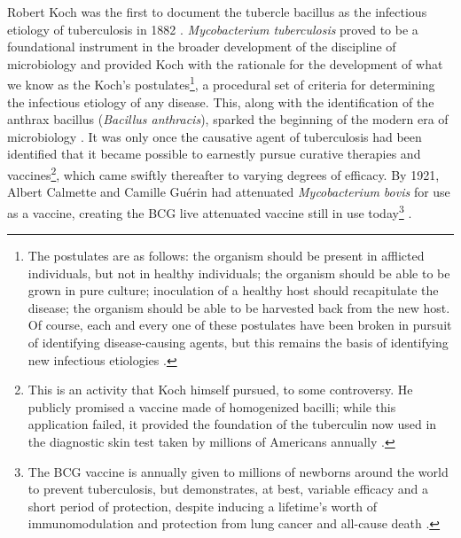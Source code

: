 Robert Koch was the first to document the tubercle bacillus as the infectious etiology of tuberculosis in 1882 \citep{Koch1882, Cambau2014}. \textit{Mycobacterium tuberculosis} proved to be a foundational instrument in the broader development of the discipline of microbiology and provided Koch with the rationale for the development of what we know as the Koch's postulates\footnote{The postulates are as follows: the organism should be present in afflicted individuals, but not in healthy individuals; the organism should be able to be grown in pure culture; inoculation of a healthy host should recapitulate the disease; the organism should be able to be harvested back from the new host. Of course, each and every one of these postulates have been broken in pursuit of identifying disease\hyp{}causing agents, but this remains the basis of identifying new infectious etiologies \citep{Segre2013}.}, a procedural set of criteria for determining the infectious etiology of any disease. This, along with the identification of the anthrax bacillus (\textit{Bacillus anthracis}), sparked the beginning of the modern era of microbiology \citep{Koch1876}. It was only once the causative agent of tuberculosis had been identified that it became possible to earnestly pursue curative therapies and vaccines\footnote{This is an activity that Koch himself pursued, to some controversy. He publicly promised a vaccine made of homogenized bacilli; while this application failed, it provided the foundation of the tuberculin now used in the diagnostic skin test taken by millions of Americans annually \citep{Goetz2014}.}, which came swiftly thereafter to varying degrees of efficacy. By 1921, Albert Calmette and Camille Gu\'{e}rin had attenuated \textit{Mycobacterium bovis} for use as a vaccine, creating the BCG live attenuated vaccine still in use today\footnote{The BCG vaccine is annually given to millions of newborns around the world to prevent tuberculosis, but demonstrates, at best, variable efficacy \citep{Schrager2020, Andersen2005, Rodrigues1993, Trauer2021} and a short period of protection, despite inducing a lifetime's worth of immunomodulation and protection from lung cancer and all\hyp{}cause death \citep{Higgins2016}.} \citep{Hawgood2007}. 

